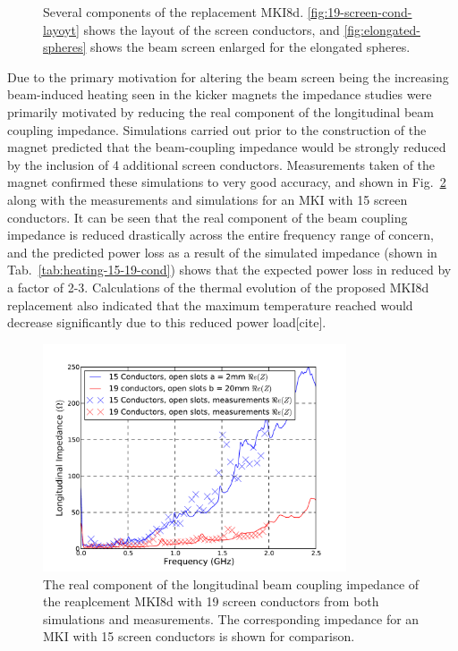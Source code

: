 \begin{figure}
\subfigure[]{
\label{fig:19-screen-cond-layout}
}
\subfigure[]{
\label{fig:elongated-spheres}
}
\label{fig:mki8d-points}
\caption{Several components of the replacement MKI8d. \ref{fig:19-screen-cond-layoyt} shows the layout of the screen conductors, and \ref{fig:elongated-spheres} shows the beam screen enlarged for the elongated spheres.}
\end{figure}

Due to the primary motivation for altering the beam screen being the increasing beam-induced heating seen in the kicker magnets the impedance studies were primarily motivated by reducing the real component of the longitudinal beam coupling impedance. Simulations carried out prior to the construction of the magnet predicted that the beam-coupling impedance would be strongly reduced by the inclusion of 4 additional screen conductors. Measurements taken of the magnet  confirmed these simulations to very good accuracy, and shown in Fig.~\ref{fig:mki-19-impedance} along with the measurements and simulations for an MKI with 15 screen conductors. It can be seen that the real component of the beam coupling impedance is reduced drastically across the entire frequency range of concern, and the predicted power loss as a result of the simulated impedance (shown in Tab.~\ref{tab:heating-15-19-cond}) shows that the expected power loss in reduced by a factor of 2-3. Calculations of the thermal evolution of the proposed MKI8d replacement also indicated that the maximum temperature reached would decrease significantly due to this reduced power load[cite]. 

\begin{figure}
\begin{center}
\includegraphics[width=0.8\textwidth]{LHC_MKI/figures/15_19_sims_measured_comparison.pdf}
\end{center}
\label{fig:mki-19-impedance}
\caption{The real component of the longitudinal beam coupling impedance of the reaplcement MKI8d with 19 screen conductors from both simulations and measurements. The corresponding impedance for an MKI with 15 screen conductors is shown for comparison.}
\end{figure}


